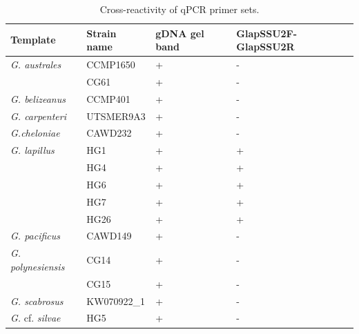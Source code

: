 \documentclass[12pt]{article}
\begin{document}
\begin{table}
\caption{Cross-reactivity of qPCR primer sets.}
\label{tbl:CrossreactTable}
\begin{tabular}{ | p{4cm} | p{3cm} | p{2cm} | p{2.5cm} | }%
\hline
\textbf{Template} & \textbf{Strain name} & \textbf{gDNA gel band} & \textbf{GlapSSU2F-GlapSSU2R} \\%
\hline
\emph{G. australes} & CCMP1650 &+&-\\%
\hline
& CG61 &+&-\\%
\hline
\emph{G. belizeanus}&CCMP401&+&-\\%
\hline
\emph{G. carpenteri}&UTSMER9A3&+&-\\%
\hline
\emph{G.cheloniae}&CAWD232&+&-\\%
\hline
\emph{G. lapillus}&HG1&+&+\\%
\hline
&HG4&+&+\\%
\hline
&HG6&+&+\\%
\hline
&HG7&+&+\\%
\hline
&HG26&+&+\\%
\hline
\emph{G. pacificus}&CAWD149&+&-\\%
\hline
\emph{G. polynesiensis}&CG14&+&-\\%
\hline
&CG15&+&-\\%
\hline
\emph{G. scabrosus}&KW070922\_1&+&-\\%
\hline
\emph{G.} cf. \emph{silvae}&HG5&+&-\\%
\hline
\end{tabular}
\end{table}
\FloatBarrier
\end{document}
